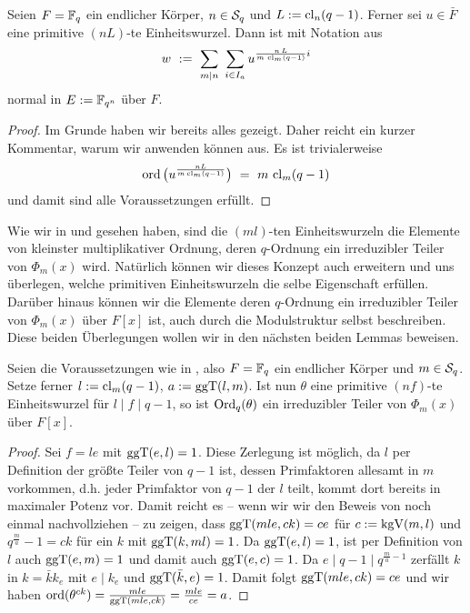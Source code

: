 \begin{satz}
  Seien $F = \F_q$ ein endlicher Körper, $n\in \S_q$ und $L:=\cl_n(q-1)$.
  Ferner sei $u \in \bar F$ eine primitive $(nL)$-te Einheitswurzel. Dann ist
  mit Notation aus 
  \[ w \speq{:=} \sum_{m\mid n} \ \sum_{i\in I_a}
    u^{\frac{n\, L}{m\, \cl_m(q-1)}i}\]
  normal in $E := \F_{q^n}$ über $F$.
\end{satz}
\begin{proof}
  Im Grunde haben wir bereits alles gezeigt. Daher reicht ein kurzer Kommentar,
  warum wir  anwenden können aus. Es ist
  trivialerweise 
  \[ \ord\big( u^{\frac{nL}{m\cl_m(q-1)}} \big) \speq=
    m\, \cl_m(q-1)\]
  und damit sind alle Voraussetzungen erfüllt.
\end{proof}

\begin{bemerkung}
  Wie wir in  und 
  gesehen haben, sind die $(ml)$-ten Einheitswurzeln die Elemente von kleinster
  multiplikativer Ordnung, deren $q$-Ordnung ein irreduzibler Teiler von
  $\Phi_m(x)$ wird. Natürlich können wir dieses Konzept auch erweitern und uns
  überlegen, welche primitiven Einheitswurzeln die selbe Eigenschaft erfüllen.
  Darüber hinaus können wir die Elemente deren $q$-Ordnung ein irreduzibler
  Teiler von $\Phi_m(x)$ über $F[x]$ ist, auch durch die Modulstruktur selbst
  beschreiben.
  Diese beiden Überlegungen wollen wir in den nächsten beiden Lemmas beweisen.
\end{bemerkung}

\begin{lemma}
  \label{lemma:hoehere_wurzeln_auch_erzeuger}
  Seien die Voraussetzungen wie in , also
  $F = \F_q$ ein endlicher Körper und $m\in \S_q$. Setze ferner 
  $l := \cl_m(q-1)$, $a := \ggT(l,m)$. 
  Ist nun $\theta$ eine primitive $(nf)$-te Einheitswurzel für 
  $l \mid f \mid q-1$, so ist $\Ord_q(\theta)$ ein irreduzibler Teiler
  von $\Phi_m(x)$ über $F[x]$.
\end{lemma}
\begin{proof}
  Sei $f = le$ mit $\ggT(e,l) = 1$. Diese Zerlegung ist möglich, da
  $l$ per Definition der größte Teiler von $q-1$ ist, dessen Primfaktoren
  allesamt in $m$ vorkommen, d.h. jeder Primfaktor von $q-1$ der $l$ teilt,
  kommt dort bereits in maximaler Potenz vor.
  Damit reicht es -- wenn wir wir den Beweis von
   noch einmal nachvollziehen -- zu zeigen,
  dass $\ggT(mle, ck) = ce$ für $c := \kgV(m,l)$ und 
  $q^{\frac m a} -1 = ck$ für ein $k$ mit $\ggT(k,ml) = 1$. Da $\ggT(e,l) = 1$,
  ist per Definition von $l$ auch $\ggT(e,m) = 1$ und damit auch
  $\ggT(e,c) = 1$. Da $e \mid q-1\mid q^{\frac m a -1}$ zerfällt $k$ 
  in $k = \bar k k_e$ mit $e \mid k_e$ und $\ggT(\bar k,e) = 1$. Damit
  folgt $\ggT(mle, ck) = ce$ und wir haben
  $\ord(\theta^{ck}) = \frac{mle}{\ggT(mle,ck)} = \frac{mle}{ce} = a$.
\end{proof}

